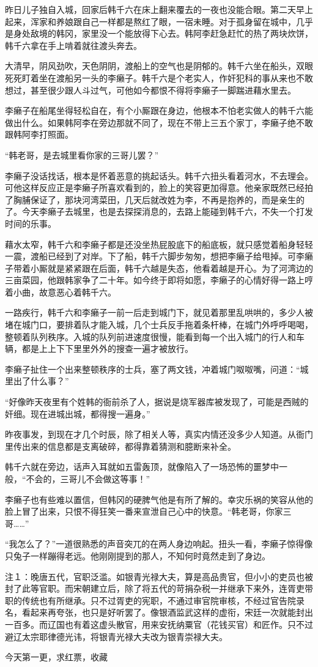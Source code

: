 昨日儿子独自入城，回家后韩千六在床上翻来覆去的一夜也没能合眼。第二天早上起来，浑家和养娘跟自己一样都是熬红了眼，一宿未睡。对于孤身留在城中，几乎是身处敌境的韩冈，家里没一个能放得下心去。韩阿李赶急赶忙的热了两块炊饼，韩千六拿在手上啃着就往渡头奔去。

大清早，阴风劲吹，天色阴阴，渡船上的空气也是阴郁的。韩千六坐在船头，双眼死死盯着坐在渡船另一头的李癞子。韩千六是个老实人，作奸犯科的事从来也不敢想过，甚至很少跟人斗过气，可他如今都恨不得将李癞子一脚踹进藉水里去。

李癞子在船尾坐得轻松自在，有个小厮跟在身边，他根本不怕老实做人的韩千六能做出什么。如果韩阿李在旁边那就不同了，现在不带上三五个家丁，李癞子绝不敢跟韩阿李打照面。

“韩老哥，是去城里看你家的三哥儿罢？”

李癞子没话找话，根本是怀着恶意的挑起话头。韩千六扭头看着河水，不去理会。可他这样反应正是李癞子所喜欢看到的，脸上的笑容更加得意。他亲家既然已经拍了胸脯保证了，那块河湾菜田，几天后就改姓为李，不再是抱养的，而是亲生的了。今天李癞子去城里，也是去探探消息的，去路上能碰到韩千六，不失一个打发时间的乐事。

藉水太窄，韩千六和李癞子都是还没坐热屁股底下的船底板，就只感觉着船身轻轻一震，渡船已经到了对岸。下了船，韩千六脚步匆匆，想把李癞子给甩掉。可李癞子带着小厮就是紧紧跟在后面，韩千六越是失态，他看着越是开心。为了河湾边的三亩菜园，他跟韩家争了二十年。如今终于即将如愿，李癞子的心情好得一路上哼着小曲，故意恶心着韩千六。

一路疾行，韩千六和李癞子一前一后走到城门下，就见着那里乱哄哄的，多少人被堵在城门口，要排着队才能入城，几个士兵反手拖着条杆棒，在城门外呼呼喝喝，整顿着队列秩序。入城的队列前进速度很慢，能看到每一个出入城门的行人和车辆，都是上上下下里里外外的搜查一遍才被放行。

李癞子扯住一个出来整顿秩序的士兵，塞了两文钱，冲着城门呶呶嘴，问道：“城里出了什么事？”

“好像昨天夜里有个姓韩的衙前杀了人，据说是烧军器库被发现了，可能是西贼的奸细。现在进城出城，都得搜一遍身。”

昨夜事发，到现在才几个时辰，除了相关人等，真实内情还没多少人知道。从衙门里传出来的信息都是支离破碎，都得靠着猜测和臆断来补全。

韩千六就在旁边，话声入耳就如五雷轰顶，就像陷入了一场恐怖的噩梦中一般，“不会的，三哥儿不会做这等事！”

李癞子也有些难以置信，但韩冈的硬脾气他是有所了解的。幸灾乐祸的笑容从他的脸上冒了出来，只恨不得狂笑一番来宣泄自己心中的快意。“韩老哥，你家三哥……”

“我怎么了？”一道很熟悉的声音突兀的在两人身边响起。扭头一看，李癞子惊得像只兔子一样蹦得老远。他刚刚提到的那人，不知何时竟然走到了身边。

注１：晚唐五代，官职泛滥。如银青光禄大夫，算是高品贵官，但小小的吏员也被封了此等官职。而宋朝建立后，除了将五代的苛捐杂税一并继承下来外，连胥吏带职的传统也有所继承。只不过胥吏的宪职，不通过审官院审核，不经过官告院录名，看起来再夸张，也只是好听罢了。像银酒监武这样的虚衔，宋廷一次就能封出一百多。而辽国也有着这虚头散官，用来安抚纳粟官（花钱买官）和匠作。只不过避辽太宗耶律德光讳，将银青光禄大夫改为银青崇禄大夫。

今天第一更，求红票，收藏

